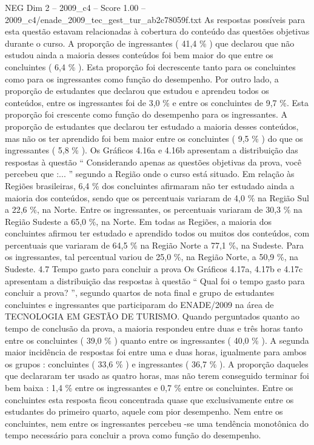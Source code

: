 \begin{textsample}{NEG Dim 2 – 2009\_c4 – Score 1.00 – 2009\_c4/enade\_2009\_tec\_gest\_tur\_ab2c78059f.txt}
As respostas possíveis para esta questão estavam relacionadas à cobertura do conteúdo das questões objetivas durante o curso.
A proporção de ingressantes ( 41,4 \% ) que declarou que não estudou ainda a maioria desses conteúdos foi bem maior do que entre os concluintes ( 6,4 \% ).
Esta proporção foi decrescente tanto para os concluintes como para os ingressantes como função do desempenho.
Por outro lado, a proporção de estudantes que declarou que estudou e aprendeu todos os conteúdos, entre os ingressantes foi de 3,0 \% e entre os concluintes de 9,7 \%.
Esta proporção foi crescente como função do desempenho para os ingressantes.
A proporção de estudantes que declarou ter estudado a maioria desses conteúdos, mas não os ter aprendido foi bem maior entre os concluintes ( 9,5 \% ) do que os ingressantes ( 5,8 \% ).
Os Gráficos 4.16a e 4.16b apresentam a distribuição das respostas à questão “ Considerando apenas as questões objetivas da prova, você percebeu que :... ” segundo a Região onde o curso está situado.
Em relação às Regiões brasileiras, 6,4 \% dos concluintes afirmaram não ter estudado ainda a maioria dos conteúdos, sendo que os percentuais variaram de 4,0 \% na Região Sul a 22,6 \%, na Norte.
Entre os ingressantes, os percentuais variaram de 30,3 \% na Região Sudeste a 65,0 \%, na Norte.
Em todas as Regiões, a maioria dos concluintes afirmou ter estudado e aprendido todos ou muitos dos conteúdos, com percentuais que variaram de 64,5 \% na Região Norte a 77,1 \%, na Sudeste.
Para os ingressantes, tal percentual variou de 25,0 \%, na Região Norte, a 50,9 \%, na Sudeste. 4.7 Tempo gasto para concluir a prova Os Gráficos 4.17a, 4.17b e 4.17c apresentam a distribuição das respostas à questão “ Qual foi o tempo gasto para concluir a prova? ”, segundo quartos de nota final e grupo de estudantes concluintes e ingressantes que participaram do ENADE/2009 na área de TECNOLOGIA EM GESTÃO DE TURISMO.
Quando perguntados quanto ao tempo de conclusão da prova, a maioria respondeu entre duas e três horas tanto entre os concluintes ( 39,0 \% ) quanto entre os ingressantes ( 40,0 \% ).
A segunda maior incidência de respostas foi entre uma e duas horas, igualmente para ambos os grupos : concluintes ( 33,6 \% ) e ingressantes ( 36,7 \% ).
A proporção daqueles que declararam ter usado as quatro horas, mas não terem conseguido terminar foi bem baixa : 1,4 \% entre os ingressantes e 0,7 \% entre os concluintes.
Entre os concluintes esta resposta ficou concentrada quase que exclusivamente entre os estudantes do primeiro quarto, aquele com pior desempenho.
Nem entre os concluintes, nem entre os ingressantes percebeu -se uma tendência monotônica do tempo necessário para concluir a prova como função do desempenho.

\end{textsample}
